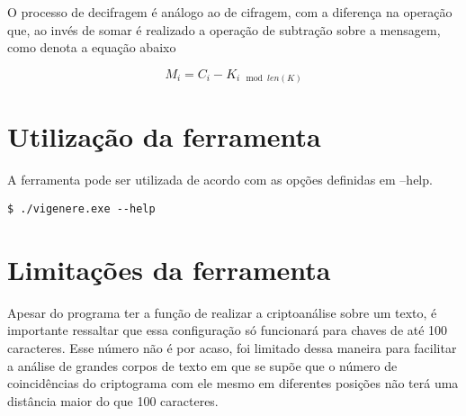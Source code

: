 \documentclass[11pt]{article}
\begin{document}
O processo de decifragem é análogo ao de cifragem, com a diferença na operação
que, ao invés de somar é realizado a operação de subtração sobre a mensagem,
como denota a equação abaixo

\begin{equation}
\label{eq:1}
M_i = C_i - K_{i \mod len(K)}
\end{equation}

\section{Utilização da ferramenta}
\label{sec:org1777b73}

A ferramenta pode ser utilizada de acordo com as opções definidas em --help.

\begin{verbatim}
$ ./vigenere.exe --help
\end{verbatim}

\section{Limitações da ferramenta}
\label{sec:orgc802874}

Apesar do programa ter a função de realizar a criptoanálise sobre um texto,
é importante ressaltar que essa configuração só funcionará para chaves de até
100 caracteres. Esse número não é por acaso, foi limitado dessa maneira para
facilitar a análise de grandes corpos de texto em que se supõe que o número
de coincidências do criptograma com ele mesmo em diferentes posições não terá
uma distância maior do que 100 caracteres.
\end{document}
